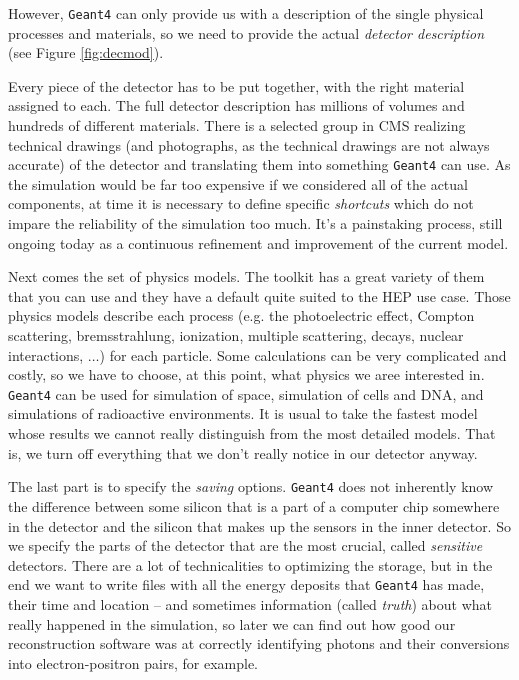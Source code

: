 However, \texttt{Geant4} can only provide us with a description of the single physical processes and materials, so we need to provide the actual \emph{detector description} (see Figure \ref{fig:decmod}). 

Every piece of the detector has to be put together, with the right material assigned to each. The full detector description has millions of volumes and hundreds of different materials. There is a selected group in CMS realizing technical drawings (and photographs, as the technical drawings are not always accurate) of the detector and translating them into something \texttt{Geant4} can use. As the simulation would be far too expensive if we considered all of the actual components, at time it is necessary to define specific \emph{shortcuts} which do not impare the reliability of the simulation too much. It’s a painstaking process, still ongoing today as a continuous refinement and improvement of the current model.

Next comes the set of physics models. The toolkit has a great variety of them that you can use and they have a default quite suited to the HEP use case. Those physics models describe each process (e.g. the photoelectric effect, Compton scattering, bremsstrahlung, ionization, multiple scattering, decays, nuclear interactions, $\dots$) for each particle. Some calculations can be very complicated and costly, so we have to choose, at this point, what physics we aree interested in. \texttt{Geant4} can be used for simulation of space, simulation of cells and DNA, and simulations of radioactive environments. It is usual to take the fastest model whose results we cannot really distinguish from the most detailed models. That is, we turn off everything that we don’t really notice in our detector anyway.

The last part is to specify the \emph{saving} options. \texttt{Geant4} does not inherently know the difference between some silicon that is a part of a computer chip somewhere in the detector and the silicon that makes up the sensors in the inner detector. So we specify the parts of the detector that are the most crucial, called \emph{sensitive} detectors. There are a lot of technicalities to optimizing the storage, but in the end we want to write files with all the energy deposits that  \texttt{Geant4} has made, their time and location – and sometimes information (called \emph{truth}) about what really happened in the simulation, so later we can find out how good our reconstruction software was at correctly identifying photons and their conversions into electron-positron pairs, for example.

